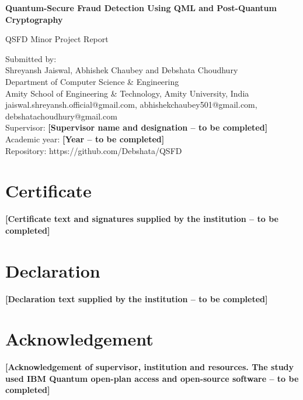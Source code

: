 \documentclass[12pt,a4paper]{report}
\newcommand{\placeholder}[1]{\textbf{[#1 -- to be completed]}}
\newcommand{\projtitle}{Quantum-Secure Fraud Detection Using QML and Post-Quantum Cryptography}
\newcommand{\projnames}{Shreyansh Jaiswal, Abhishek Chaubey and Debshata Choudhury}
\begin{document}

\begin{titlepage}
\thispagestyle{empty}
\centering
\vspace*{1cm}
{\fontsize{18}{22}\bfseries\selectfont \projtitle\par}
\vspace{1cm}
{\large QSFD Minor Project Report\par}
\vspace{1.5cm}
Submitted by:\\ \projnames\\[0.5cm]
Department of Computer Science \& Engineering\\
Amity School of Engineering \& Technology, Amity University, India\\[0.3cm]
{\small jaiswal.shreyansh.official@gmail.com, abhishekchaubey501@gmail.com, debshatachoudhury@gmail.com}\\[1cm]
Supervisor: \placeholder{Supervisor name and designation}\\[0.5cm]
Academic year: \placeholder{Year}\\[2cm]
{\small Repository: https://github.com/Debshata/QSFD}
\end{titlepage}

\pagestyle{nohdr}
\chapter*{Certificate}
\placeholder{Certificate text and signatures supplied by the institution}

\chapter*{Declaration}
\placeholder{Declaration text supplied by the institution}

\chapter*{Acknowledgement}
\placeholder{Acknowledgement of supervisor, institution and resources. The study used IBM Quantum open-plan access and open-source software}

\renewcommand{\contentsname}{Table of Contents}
\tableofcontents
\renewcommand{\listfigurename}{Figure Index}
\listoffigures
\listoftables
\end{document}
